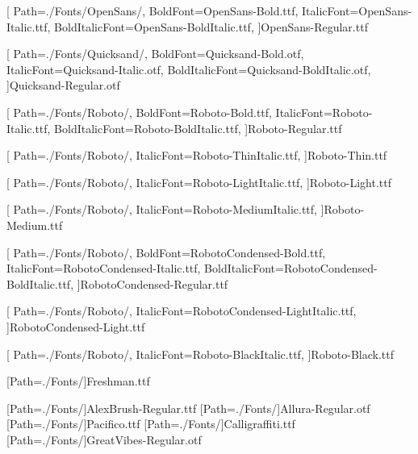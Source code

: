 
\newfontfamily{\opensans}[
Path=./Fonts/OpenSans/,
BoldFont=OpenSans-Bold.ttf,
ItalicFont=OpenSans-Italic.ttf,
BoldItalicFont=OpenSans-BoldItalic.ttf,
]{OpenSans-Regular.ttf}


\newfontfamily{\quicksand}[
Path=./Fonts/Quicksand/,
BoldFont=Quicksand-Bold.otf,
ItalicFont=Quicksand-Italic.otf,
BoldItalicFont=Quicksand-BoldItalic.otf,
]{Quicksand-Regular.otf}




\newfontfamily{\roboto}[
Path=./Fonts/Roboto/,
BoldFont=Roboto-Bold.ttf,
ItalicFont=Roboto-Italic.ttf,
BoldItalicFont=Roboto-BoldItalic.ttf,
]{Roboto-Regular.ttf}

\newfontfamily{\robotot}[
Path=./Fonts/Roboto/,
ItalicFont=Roboto-ThinItalic.ttf,
]{Roboto-Thin.ttf}

\newfontfamily{\robotol}[
Path=./Fonts/Roboto/,
ItalicFont=Roboto-LightItalic.ttf,
]{Roboto-Light.ttf}

\newfontfamily{\robotom}[
Path=./Fonts/Roboto/,
ItalicFont=Roboto-MediumItalic.ttf,
]{Roboto-Medium.ttf}


\newfontfamily{\robotoc}[
Path=./Fonts/Roboto/,
BoldFont=RobotoCondensed-Bold.ttf,
ItalicFont=RobotoCondensed-Italic.ttf,
BoldItalicFont=RobotoCondensed-BoldItalic.ttf,
]{RobotoCondensed-Regular.ttf}


\newfontfamily{\robotocl}[
Path=./Fonts/Roboto/,
ItalicFont=RobotoCondensed-LightItalic.ttf,
]{RobotoCondensed-Light.ttf}


\newfontfamily{\robotob}[
Path=./Fonts/Roboto/,
ItalicFont=Roboto-BlackItalic.ttf,
]{Roboto-Black.ttf}





\newfontfamily{\michigan}[Path=./Fonts/]{Freshman.ttf}

\newfontfamily{\alexbrush}[Path=./Fonts/]{AlexBrush-Regular.ttf}
\newfontfamily{\allura}[Path=./Fonts/]{Allura-Regular.otf}
\newfontfamily{\pacifico}[Path=./Fonts/]{Pacifico.ttf}
\newfontfamily{\calligraffiti}[Path=./Fonts/]{Calligraffiti.ttf}
\newfontfamily{\greatvibes}[Path=./Fonts/]{GreatVibes-Regular.otf}